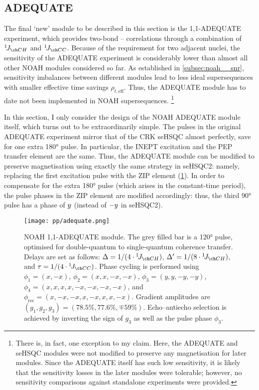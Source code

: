 \subsection{ADEQUATE}
\label{subsec:noah__adequate}

The final `new' module to be described in this section is the 1,1-ADEQUATE experiment\autocite{Reif1996JMRSA}, which provides two-bond -- correlations through a combination of $\oneJ{CH}$ and $\oneJ{CC}$.
Because of the requirement for two adjacent \carbon{} nuclei, the sensitivity of the ADEQUATE experiment is considerably lower than almost all other NOAH modules considered so far.
As established in \cref{subsec:noah__snr}, sensitivity imbalances between different modules lead to less ideal supersequences with smaller effective time savings $\rho_{t,\text{eff}}$.
Thus, the ADEQUATE module has to date not been implemented in NOAH supersequences.%
\footnote{There is, in fact, one exception to my claim\autocite{RaoKakita2020RSCA}. Here, the ADEQUATE and seHSQC modules were not modified to preserve any magnetisation for later modules. Since the ADEQUATE itself has such low sensitivity, it is likely that the sensitivity losses in the later modules were tolerable; however, no sensitivity comparisons against standalone experiments were provided.}

In this section, I only consider the design of the NOAH ADEQUATE module itself, which turns out to be extraordinarily simple.
The \proton{} pulses in the original ADEQUATE experiment mirror that of the CRK seHSQC almost perfectly, save for one extra \ang{180} pulse.
In particular, the INEPT excitation and the PEP transfer element are the same.
Thus, the ADEQUATE module can be modified to preserve  magnetisation using exactly the same strategy in seHSQC2: namely, replacing the first \proton{} excitation pulse with the ZIP element (\cref{fig:adequate_noah}).
In order to compensate for the extra \ang{180} pulse (which arises in the constant-time period), the pulse phases in the ZIP element are modified accordingly: thus, the third \proton{} \ang{90} pulse has a phase of $y\/$ (instead of $-y\/$ in seHSQC2).

\begin{figure}[htb]
    \centering
    \texttt{[image: pp/adequate.png]}%
    \caption[NOAH 1,1-ADEQUATE module]{
        NOAH 1,1-ADEQUATE module.
        The grey filled bar is a \ang{120} pulse, optimised for \carbon{} double-quantum to single-quantum coherence transfer\autocite{Mareci1982JMR}.
        Delays are set as follows: $\Delta = 1 / (4 \cdot \oneJ{CH})$, $\Delta' = 1 / (8 \cdot \oneJ{CH})$, and $\tau = 1 / (4 \cdot \oneJ{CC})$.
        Phase cycling is performed using $\phi_1 = (x, -x)$, $\phi_2 = (x, x, -x, -x)$, $\phi_3 = (y, y, -y, -y)$, $\phi_4 = (x, x, x, x, -x, -x, -x, -x)$, and $\phi_\text{rec} = (x, -x, -x, x, -x, x, x, -x)$.
        Gradient amplitudes are $(g_1, g_2, g_3) = (78.5\%, 77.6\%, \mp 59\%)$.
        Echo--antiecho selection is achieved by inverting the sign of $g_3$ as well as the pulse phase $\phi_3$.
    }
    \label{fig:adequate_noah}
\end{figure}

